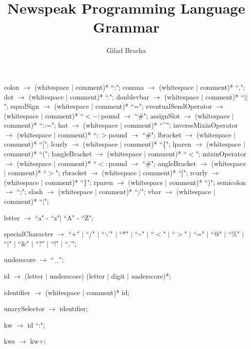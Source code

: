 \documentclass{article}
\title{Newspeak Programming Language Grammar}
\author{Gilad Bracha}
\begin{document}
\begin{newspeak}  
  
colon $\rightarrow$ (whitespace $|$ comment)* ``:";
comma $\rightarrow$ (whitespace $|$ comment)* ``,";
dot $\rightarrow$ (whitespace $|$ comment)* ``.";
doublevbar $\rightarrow$ (whitespace $|$ comment)* ``$||$";
equalSign $\rightarrow$ (whitespace $|$ comment)* ``=";
eventualSendOperator $\rightarrow$  (whitespace $|$ comment)* ``$<-:$pound $\rightarrow$ ``\#";
assignSlot $\rightarrow$ (whitespace $|$ comment)* ``::=";
hat $\rightarrow$ (whitespace $|$ comment)* ``\^{}";
inverseMixinOperator $\rightarrow$  (whitespace $|$ comment)* ``$:>$pound $\rightarrow$ ``\#";
lbracket $\rightarrow$ (whitespace $|$ comment)* ``[";
lcurly $\rightarrow$ (whitespace $|$ comment)* ``\{";
lparen $\rightarrow$ (whitespace $|$ comment)* ``(";
langleBracket $\rightarrow$ (whitespace $|$ comment)* ``$<$";
mixinOperator $\rightarrow$  (whitespace $|$ comment)* ``$<:$pound $\rightarrow$ ``\#";
angleBracket $\rightarrow$ (whitespace $|$ comment)* ``$>$";
rbracket $\rightarrow$ (whitespace $|$ comment)* ``]";
rcurly $\rightarrow$ (whitespace $|$ comment)* ``\}";
rparen $\rightarrow$ (whitespace $|$ comment)* ``)";
semicolon $\rightarrow$ ``;";
slash $\rightarrow$ (whitespace $|$ comment)* ``/";
vbar $\rightarrow$ (whitespace $|$ comment)* ``$|$";
                                                                                                       
letter $\rightarrow$   ``a" - ``z"$|$  ``A" - ``Z";
                                                             
specialCharacter $\rightarrow$   ``+"   $|$  ``/" $|$   ``$\backslash$'" $|$  ``*"   $|$  ``\~{}"  $|$ 
                                        ``$<$" $|$  ``$>$" $|$  ``=" $|$  ``@"  $|$  ``\%" $|$ 
                                      ``$|$"  $|$  ``\&" $|$  ``?"  $|$  ``!" $|$   ``,'";      
                                     
underscore $\rightarrow$  ``\_";                                                       

id $\rightarrow$ (letter $|$ underscore)  (letter $|$ digit $|$ underscore)*;
                                           
identifier $\rightarrow$  (whitespace $|$ comment)*  id;
 
unarySelector $\rightarrow$ identifier;

kw $\rightarrow$ id  ``:"; 

kws $\rightarrow$ kw+;   
  

\end{newspeak}
\end{document}
